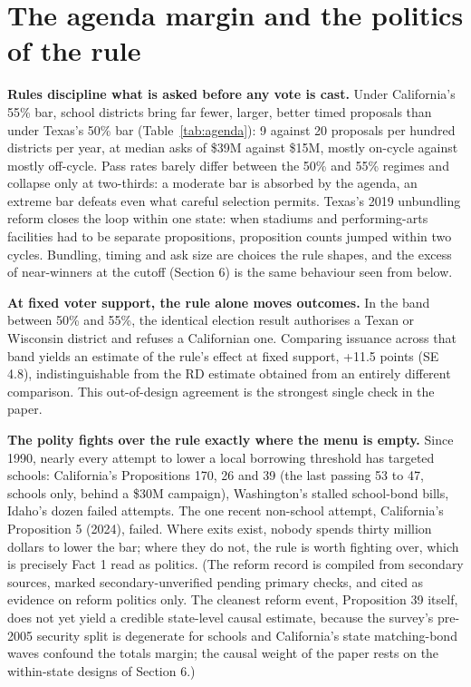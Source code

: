 \section{The agenda margin and the politics of the rule}
\textbf{Rules discipline what is asked before any vote is cast.} Under California's 55\% bar, school districts bring far fewer, larger, better timed proposals than under Texas's 50\% bar (Table~\ref{tab:agenda}): 9 against 20 proposals per hundred districts per year, at median asks of \$39M against \$15M, mostly on-cycle against mostly off-cycle. Pass rates barely differ between the 50\% and 55\% regimes and collapse only at two-thirds: a moderate bar is absorbed by the agenda, an extreme bar defeats even what careful selection permits. Texas's 2019 unbundling reform closes the loop within one state: when stadiums and performing-arts facilities had to be separate propositions, proposition counts jumped within two cycles. Bundling, timing and ask size are choices the rule shapes, and the excess of near-winners at the cutoff (Section 6) is the same behaviour seen from below.


\textbf{At fixed voter support, the rule alone moves outcomes.} In the band between 50\% and 55\%, the identical election result authorises a Texan or Wisconsin district and refuses a Californian one. Comparing issuance across that band yields an estimate of the rule's effect at fixed support, +11.5 points (SE 4.8), indistinguishable from the RD estimate obtained from an entirely different comparison. This out-of-design agreement is the strongest single check in the paper.

\textbf{The polity fights over the rule exactly where the menu is empty.} Since 1990, nearly every attempt to lower a local borrowing threshold has targeted schools: California's Propositions 170, 26 and 39 (the last passing 53 to 47, schools only, behind a \$30M campaign), Washington's stalled school-bond bills, Idaho's dozen failed attempts. The one recent non-school attempt, California's Proposition 5 (2024), failed. Where exits exist, nobody spends thirty million dollars to lower the bar; where they do not, the rule is worth fighting over, which is precisely Fact 1 read as politics. (The reform record is compiled from secondary sources, marked secondary-unverified pending primary checks, and cited as evidence on reform politics only. The cleanest reform event, Proposition 39 itself, does not yet yield a credible state-level causal estimate, because the survey's pre-2005 security split is degenerate for schools and California's state matching-bond waves confound the totals margin; the causal weight of the paper rests on the within-state designs of Section 6.)

